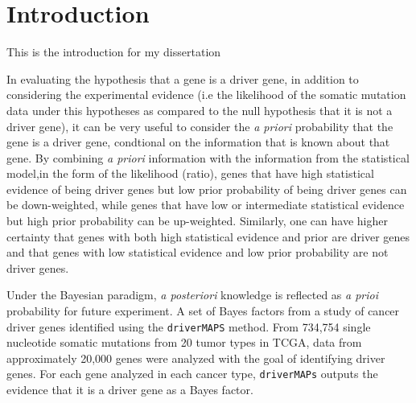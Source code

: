 \chapter{Introduction}
\label{introduction}

This is the introduction for my dissertation


In evaluating the hypothesis that a gene is a driver gene, in addition to considering the experimental evidence (i.e the likelihood of the somatic mutation data under this hypotheses as compared to the null hypothesis that it is not a driver gene), it can be very useful to consider the \emph{a priori} probability that the gene is a driver gene, condtional on the information that is known about that gene.  By combining \emph{a priori} information with the information from the statistical model,in the form of the likelihood (ratio), genes that have high statistical evidence of being driver genes but low prior probability of being driver genes can be down-weighted, while genes that have low or intermediate statistical evidence but high prior probability can be up-weighted.  Similarly, one can have higher certainty that genes with  both high statistical evidence and prior are driver genes and that genes with low statistical evidence and low prior probability are not driver genes.

Under the Bayesian paradigm, \emph{a posteriori} knowledge is reflected as \emph{a prioi} probability for future experiment.  A set of Bayes factors from a study of cancer driver genes identified using the \texttt{driverMAPS} method\cite{drivermaps}.  From 734,754 single nucleotide somatic mutations from 20 tumor types in TCGA, data from approximately 20,000 genes were analyzed with the goal of identifying driver genes. For each gene analyzed in each cancer type, \texttt{driverMAPs} outputs the evidence that it is a driver gene as a Bayes factor.  